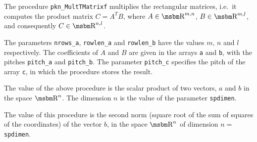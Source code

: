 \vspace{\bigskipamount}
The procedure \texttt{pkn\_MultTMatrixf}  multiplies the rectangular matrices,
i.e.\ it computes the product matrix $C=A^TB$, where $A\in\R^{m,n}$,
$B\in\R^{m,l}$, and consequently $C\in\R^{n,l}$.

The parameters \texttt{nrows\_a}, \texttt{rowlen\_a} and \texttt{rowlen\_b}
have the values $m$, $n$ and $l$ respectively. The coefficients of $A$ and $B$
are given in the arrays \texttt{a} and \texttt{b}, with the pitches
\texttt{pitch\_a} and \texttt{pitch\_b}. The parameter \texttt{pitch\_c}
specifies the pitch of the array \texttt{c}, in which the procedure stores
the result.

\vspace{\bigskipamount}


\vspace{\bigskipamount}
The value of the above procedure is the scalar product of two vectors,
$a$ and $b$ in the space $\R^n$. The dimension $n$ is the value of the
parameter \texttt{spdimen}.

\vspace{\bigskipamount}
The value of this procedure is the second norm (square root of the sum
of squares of the coordinates) of the vector $b$, in the space $\R^n$
of dimension $n=$\texttt{spdimen}.

